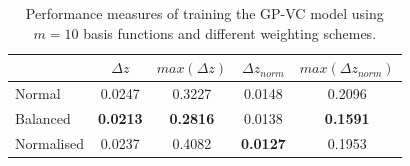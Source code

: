 \documentclass[useAMS,usenatbib,fleqn]{mn2e}
\begin{document}
 \begin{table}
\caption{Performance measures of training the GP-VC model using $m=10$ basis functions and different weighting schemes.}
\begin{center}
  \begin{tabular}{| l | c | c | c | c |}
     				&	$\Delta z$	&	$max\left(\Delta z\right)$		&	$\Delta z_{norm}$		&	$max\left(\Delta z_{norm}\right)$	\\	\hline
	Normal		&	0.0247		&	0.3227			&	0.0148				&	0.2096				\\
	Balanced		&	\textbf{0.0213}	&	\textbf{0.2816}		&	0.0138				&	\textbf{0.1591}			\\
	Normalised	&	0.0237		&	0.4082			&	\textbf{0.0127}			&	0.1953				\\	\hline
  \end{tabular}
\end{center}
\label{table-normal-balanced}
\end{table}
\end{document}
